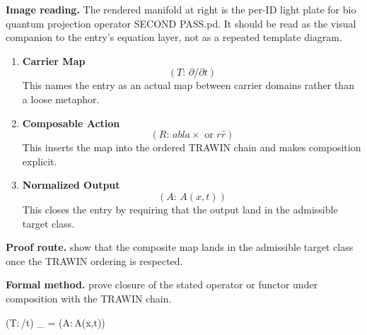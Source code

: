\begin{samepage}
\noindent\begin{minipage}[t]{0.45\linewidth}
\vspace{0pt}
\raggedright
\scriptsize\textbf{Image reading.} The rendered manifold at right is the per-ID light plate for bio quantum projection operator SECOND PASS.pd. It should be read as the visual companion to the entry's equation layer, not as a repeated template diagram.\par
\end{minipage}\hfill
\begin{minipage}[t]{0.53\linewidth}
\vspace*{-0.10in}
\raggedright
{}
\end{minipage}
\end{samepage}

\clearpage


\begin{enumerate}[leftmargin=1.6em,itemsep=9pt,topsep=6pt]
\item \textbf{Carrier Map}
\[
(T:\,\partial/\partial t)
\]
This names the entry as an actual map between carrier domains rather than a loose metaphor.

\item \textbf{Composable Action}
\[
(R:\, abla\times\text{ or }r\hat{r})
\]
This inserts the map into the ordered TRAWIN chain and makes composition explicit.

\item \textbf{Normalized Output}
\[
(A:\,A(x,t))
\]
This closes the entry by requiring that the output land in the admissible target class.
\end{enumerate}

\textbf{Proof route.} show that the composite map lands in the admissible target class once the TRAWIN ordering is respected.

\textbf{Formal method.} prove closure of the stated operator or functor under composition with the TRAWIN chain.

\medskip
{}

\begin{tzpsnapshot}
\end{tzpsnapshot}

\tzpequationlinks
  {(T:\,\partial/\partial t)}
  {_{} = \cdots}
  {(A:\,A(x,t))}
